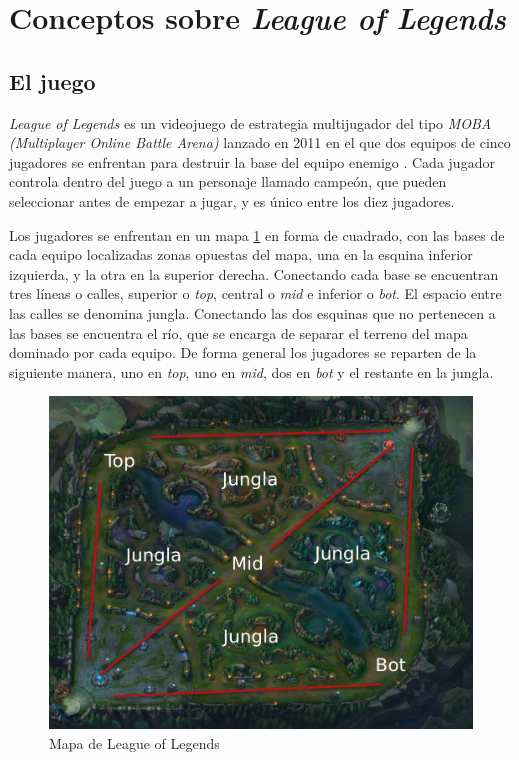 
\section{Conceptos sobre \textit{League of Legends}}

\subsection{El juego}
\textit{League of Legends} es un videojuego de estrategia multijugador del tipo \textit{MOBA (Multiplayer Online Battle Arena)} lanzado en 2011 en el que dos equipos de cinco jugadores se enfrentan para destruir la base del equipo enemigo \cite{misc:como-jugar}. Cada jugador controla dentro del juego a un personaje llamado campeón, que pueden seleccionar antes de empezar a jugar, y es único entre los diez jugadores.

Los jugadores se enfrentan en un mapa \ref{fig:mapa-lol} en forma de cuadrado, con las bases de cada equipo localizadas zonas opuestas del mapa, una en la esquina inferior izquierda, y la otra en la superior derecha. Conectando cada base se encuentran tres líneas o calles, superior o \textit{top}, central o \textit{mid} e inferior o \textit{bot}. El espacio entre las calles se denomina jungla. Conectando las dos esquinas que no pertenecen a las bases se encuentra el río, que se encarga de separar el terreno del mapa dominado por cada equipo. De forma general los jugadores se reparten de la siguiente manera, uno en \textit{top}, uno en \textit{mid}, dos en \textit{bot} y el restante en la jungla.

\begin{figure}
	\centering
	\includegraphics[width=1\linewidth]{img/mapa-lol}
	\caption{Mapa de League of Legends}
	\label{fig:mapa-lol}
\end{figure}

